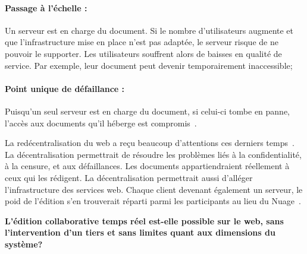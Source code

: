 \paragraph{Passage à l'échelle :} Un serveur est en charge du document. Si le
nombre d'utilisateurs augmente et que l'infrastructure mise en place n'est pas
adaptée, le serveur risque de ne pouvoir le supporter. Les utilisateurs
souffrent alors de baisses en qualité de service. Par exemple, leur document
peut devenir temporairement inaccessible;

\paragraph{Point unique de défaillance :} Puisqu'un seul serveur est en charge
du document, si celui-ci tombe en panne, l'accès aux documents qu'il héberge est
compromis~\cite{demers1987epidemic}.
  

La redécentralisation du web a reçu beaucoup d'attentions ces derniers
temps~\cite{mansour2016demonstration, wood2014ethereum}. La décentralisation
permettrait de résoudre les problèmes liés à la confidentialité, à la censure,
et aux défaillances. Les documents appartiendraient réellement à ceux qui les
rédigent. La décentralisation permettrait aussi d'alléger l'infrastructure des
services web. Chaque client devenant également un serveur, le poid de l'édition
s'en trouverait réparti parmi les participants au lieu du
Nuage~\cite{mell2011national}.



\textbf{L'édition collaborative temps réel est-elle possible sur le web, sans
  l'intervention d'un tiers et sans limites quant aux dimensions du système?}




